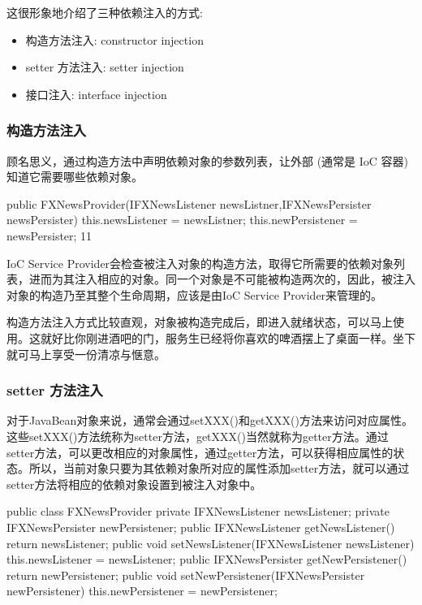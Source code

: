 这很形象地介绍了三种依赖注入的方式:
\begin{itemize}
    \item 构造方法注入: constructor injection
    \item setter 方法注入: setter injection
    \item 接口注入: interface injection
\end{itemize}

\subsubsection{构造方法注入}

顾名思义，通过构造方法中声明依赖对象的参数列表，让外部 (通常是 IoC 容器) 知道它需要哪些依赖对象。

\begin{Java}
public FXNewsProvider(IFXNewsListener newsListner,IFXNewsPersister newsPersister) {   
    this.newsListener   = newsListner; 
    this.newPersistener = newsPersister; 11 
}
\end{Java}

IoC Service Provider会检查被注入对象的构造方法，取得它所需要的依赖对象列表，进而为其注入相应的对象。同一个对象是不可能被构造两次的，因此，被注入对象的构造乃至其整个生命周期，应该是由IoC Service Provider来管理的。

构造方法注入方式比较直观，对象被构造完成后，即进入就绪状态，可以马上使用。这就好比你刚进酒吧的门，服务生已经将你喜欢的啤酒摆上了桌面一样。坐下就可马上享受一份清凉与惬意。

\subsubsection{setter 方法注入}

对于JavaBean对象来说，通常会通过setXXX()和getXXX()方法来访问对应属性。这些setXXX()方法统称为setter方法，getXXX()当然就称为getter方法。通过setter方法，可以更改相应的对象属性，通过getter方法，可以获得相应属性的状态。所以，当前对象只要为其依赖对象所对应的属性添加setter方法，就可以通过setter方法将相应的依赖对象设置到被注入对象中。

\begin{Java}
public class FXNewsProvider {
    private IFXNewsListener  newsListener;
    private IFXNewsPersister newPersistener;
    public IFXNewsListener getNewsListener() {     
        return  newsListener;    
    }    
    public void setNewsListener(IFXNewsListener newsListener) {     
        this.newsListener = newsListener;   
    }    
    public IFXNewsPersister getNewPersistener() {     
        return  newPersistener;    
    }    
    public void setNewPersistener(IFXNewsPersister newPersistener) {     
        this.newPersistener = newPersistener;   
    }
}
\end{Java}

